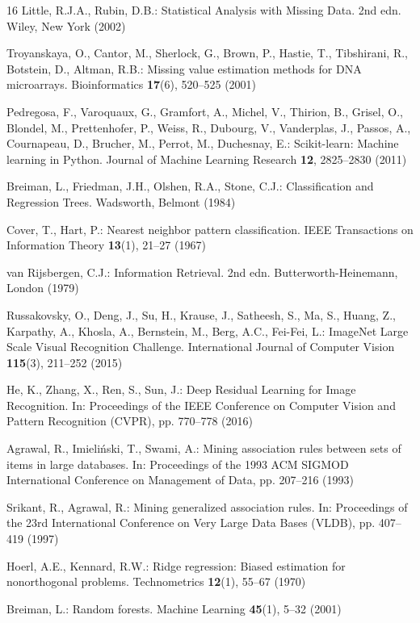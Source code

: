 \documentclass[runningheads]{llncs}
\begin{document}
\begin{thebibliography}{16}
Little, R.J.A., Rubin, D.B.: Statistical Analysis with Missing Data. 2nd edn. Wiley, New York (2002)

Troyanskaya, O., Cantor, M., Sherlock, G., Brown, P., Hastie, T., Tibshirani, R., Botstein, D., Altman, R.B.: Missing value estimation methods for DNA microarrays. Bioinformatics \textbf{17}(6), 520--525 (2001)

Pedregosa, F., Varoquaux, G., Gramfort, A., Michel, V., Thirion, B., Grisel, O., Blondel, M., Prettenhofer, P., Weiss, R., Dubourg, V., Vanderplas, J., Passos, A., Cournapeau, D., Brucher, M., Perrot, M., Duchesnay, E.: Scikit-learn: Machine learning in Python. Journal of Machine Learning Research \textbf{12}, 2825--2830 (2011)

Breiman, L., Friedman, J.H., Olshen, R.A., Stone, C.J.: Classification and Regression Trees. Wadsworth, Belmont (1984)

Cover, T., Hart, P.: Nearest neighbor pattern classification. IEEE Transactions on Information Theory \textbf{13}(1), 21--27 (1967)

van Rijsbergen, C.J.: Information Retrieval. 2nd edn. Butterworth-Heinemann, London (1979)

Russakovsky, O., Deng, J., Su, H., Krause, J., Satheesh, S., Ma, S., Huang, Z., Karpathy, A., Khosla, A., Bernstein, M., Berg, A.C., Fei-Fei, L.: ImageNet Large Scale Visual Recognition Challenge. International Journal of Computer Vision \textbf{115}(3), 211--252 (2015)

He, K., Zhang, X., Ren, S., Sun, J.: Deep Residual Learning for Image Recognition. In: Proceedings of the IEEE Conference on Computer Vision and Pattern Recognition (CVPR), pp. 770--778 (2016)


Agrawal, R., Imieliński, T., Swami, A.: Mining association rules between sets of items in large databases. In: Proceedings of the 1993 ACM SIGMOD International Conference on Management of Data, pp. 207--216 (1993)

Srikant, R., Agrawal, R.: Mining generalized association rules. In: Proceedings of the 23rd International Conference on Very Large Data Bases (VLDB), pp. 407--419 (1997)

Hoerl, A.E., Kennard, R.W.: Ridge regression: Biased estimation for nonorthogonal problems. Technometrics \textbf{12}(1), 55--67 (1970)

Breiman, L.: Random forests. Machine Learning \textbf{45}(1), 5--32 (2001)
\end{thebibliography}
\end{document}
